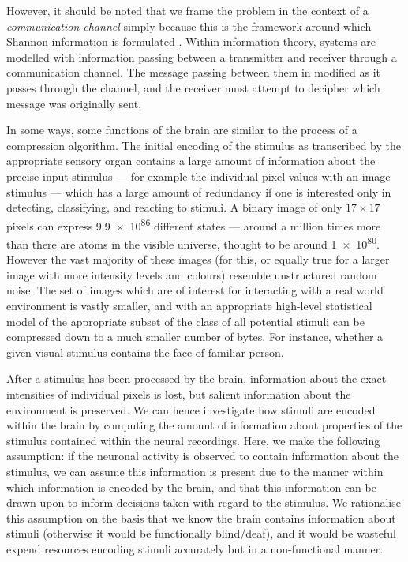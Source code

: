 However, it should be noted that we frame the problem in the context of a \textit{communication channel} simply because this is the framework around which Shannon information is formulated \citep{mackay2003information}.
Within information theory, systems are modelled with information passing between a transmitter and receiver through a communication channel.
The message passing between them in modified as it passes through the channel, and the receiver must attempt to decipher which message was originally sent.

In some ways, some functions of the brain are similar to the process of a compression algorithm.
The initial encoding of the stimulus as transcribed by the appropriate sensory organ contains a large amount of information about the precise input stimulus --- for example the individual pixel values with an image stimulus --- which has a large amount of redundancy if one is interested only in detecting, classifying, and reacting to stimuli.
A binary image of only $17 \times 17$ pixels can express \num{9.9e86} different states --- around a million times more than there are atoms in the visible universe, thought to be around \num{1e80}.
However the vast majority of these images (for this, or equally true for a larger image with more intensity levels and colours) resemble unstructured random noise.
The set of images which are of interest for interacting with a real world environment is vastly smaller, and with an appropriate high-level statistical model of the appropriate subset of the class of all potential stimuli can be compressed down to a much smaller number of bytes.
For instance, whether a given visual stimulus contains the face of familiar person.

After a stimulus has been processed by the brain, information about the exact intensities of individual pixels is lost, but salient information about the environment is preserved.
We can hence investigate how stimuli are encoded within the brain by computing the amount of information about properties of the stimulus contained within the neural recordings.
Here, we make the following assumption: if the neuronal activity is observed to contain information about the stimulus, we can assume this information is present due to the manner within which information is encoded by the brain, and that this information can be drawn upon to inform decisions taken with regard to the stimulus.
We rationalise this assumption on the basis that we know the brain contains information about stimuli (otherwise it would be functionally blind/deaf), and it would be wasteful expend resources encoding stimuli accurately but in a non-functional manner.


